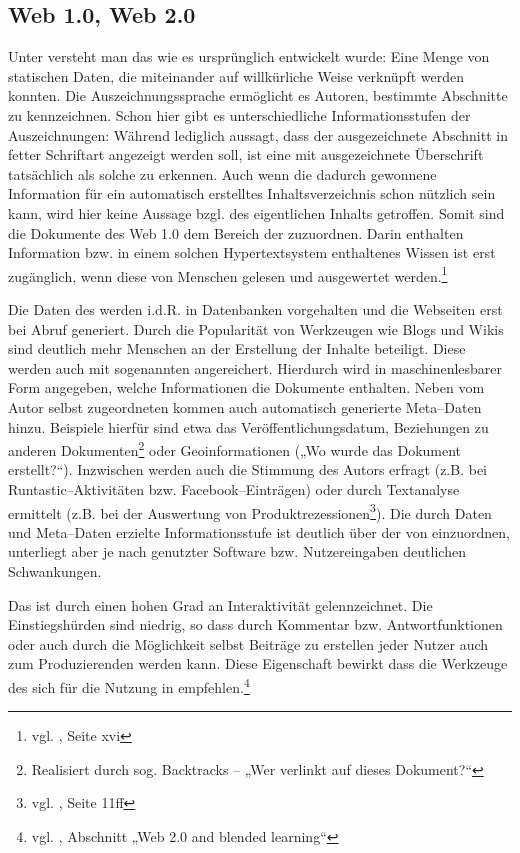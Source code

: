 \subsection{Web 1.0, Web 2.0}

Unter  versteht man das  wie es ursprünglich entwickelt wurde: Eine Menge von statischen Daten, die miteinander auf willkürliche Weise verknüpft werden konnten. Die Auszeichnungssprache  ermöglicht es Autoren, bestimmte Abschnitte zu kennzeichnen. Schon hier gibt es unterschiedliche Informationsstufen der Auszeichnungen: Während  lediglich aussagt, dass der ausgezeichnete Abschnitt in fetter Schriftart angezeigt werden soll, ist eine mit  ausgezeichnete Überschrift tatsächlich als solche zu erkennen. Auch wenn die dadurch gewonnene Information für ein automatisch erstelltes Inhaltsverzeichnis schon nützlich sein kann, wird hier keine Aussage bzgl. des eigentlichen Inhalts getroffen. Somit sind die Dokumente des Web 1.0 dem Bereich der  zuzuordnen. Darin enthalten Information bzw. in einem solchen Hypertextsystem enthaltenes Wissen ist erst zugänglich, wenn diese von Menschen gelesen und ausgewertet werden.\footnote{vgl. \cite{alkhatib}, Seite xvi} 

Die Daten des  werden i.d.R. in Datenbanken vorgehalten und die Webseiten erst bei Abruf generiert. Durch die Popularität von Werkzeugen wie Blogs und Wikis sind deutlich mehr Menschen an der Erstellung der Inhalte beteiligt. Diese werden auch mit sogenannten  angereichert. Hierdurch wird in maschinenlesbarer Form angegeben, welche Informationen die Dokumente enthalten. Neben vom Autor selbst zugeordneten  kommen auch automatisch generierte Meta--Daten hinzu. Beispiele hierfür sind etwa das Veröffentlichungsdatum, Beziehungen zu anderen Dokumenten\footnote{Realisiert durch sog. Backtracks -- „Wer verlinkt auf dieses Dokument?“} oder Geoinformationen („Wo wurde das Dokument erstellt?“). Inzwischen werden auch die Stimmung des Autors erfragt (z.B. bei Runtastic–Aktivitäten bzw. Facebook--Einträgen) oder durch Textanalyse ermittelt (z.B. bei der Auswertung von Produktrezessionen\footnote{vgl. \cite{sprejz}, Seite 11ff}). Die durch Daten und Meta--Daten erzielte Informationsstufe ist deutlich über der von  einzuordnen, unterliegt aber je nach genutzter Software bzw. Nutzereingaben deutlichen Schwankungen.

Das  ist durch einen hohen Grad an Interaktivität gelennzeichnet. Die Einstiegshürden sind niedrig, so dass durch Kommentar bzw. Antwortfunktionen oder auch durch die Möglichkeit selbst Beiträge zu erstellen jeder Nutzer auch zum Produzierenden werden kann. Diese Eigenschaft bewirkt dass die Werkzeuge des  sich für die Nutzung in  empfehlen.\footnote{vgl. \cite{livingston}, Abschnitt „Web 2.0 and blended learning“}


